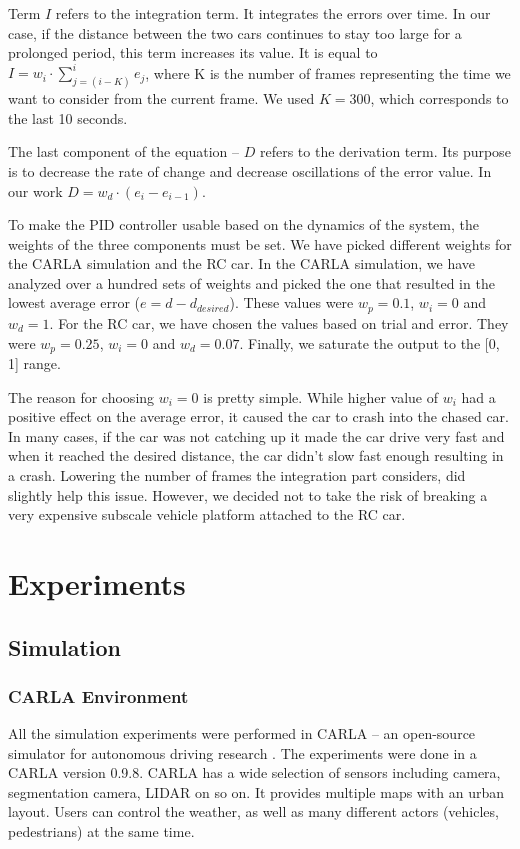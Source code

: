 \documentclass{ctuthesis/ctuthesis}
\begin{document}
Term $I$ refers to the integration term. It integrates the errors over time. In our case, if the distance between the two cars continues to stay too large for a prolonged period, this term increases its value. It is equal to $I = w_i\cdot \sum_{j=(i-K)}^{i} e_j$, where K is the number of frames representing the time we want to consider from the current frame. We used $K = 300$, which corresponds to the last 10 seconds.\par


The last component of the equation -- $D$ refers to the derivation term. Its purpose is to decrease the rate of change and decrease oscillations of the error value. In our work $D = w_d\cdot (e_i-e_{i-1})$. \par


To make the PID controller usable based on the dynamics of the system, the weights of the three components must be set. We have picked different weights for the CARLA simulation and the RC car. In the CARLA simulation, we have analyzed over a hundred sets of weights and picked the one that resulted in the lowest average error ($e = d - d_{desired}$). These values were $w_p=0.1$, $w_i=0$ and $w_d=1$. For the RC car, we have chosen the values based on trial and error. They were $w_p=0.25$, $w_i=0$ and $w_d=0.07$. Finally, we saturate the output to the [0, 1] range. \par


The reason for choosing $w_i=0$ is pretty simple. While higher value of $w_i$ had a positive effect on the average error, it caused the car to crash into the chased car. In many cases, if the car was not catching up it made the car drive very fast and when it reached the desired distance, the car didn't slow fast enough resulting in a crash. Lowering the number of frames the integration part considers, did slightly help this issue. However, we decided not to take the risk of breaking a very expensive subscale vehicle platform attached to the RC car.



\chapter{Experiments}\label{s:experiments}
\section{Simulation}
\subsection{CARLA Environment}
All the simulation experiments were performed in CARLA -- an open-source simulator for autonomous driving research \cite{CARLA}. The experiments were done in a CARLA version 0.9.8. CARLA has a wide selection of sensors including camera, segmentation camera, LIDAR on so on. It provides multiple maps with an urban layout. Users can control the weather, as well as many different actors (vehicles, pedestrians) at the same time. \par
\end{document}

